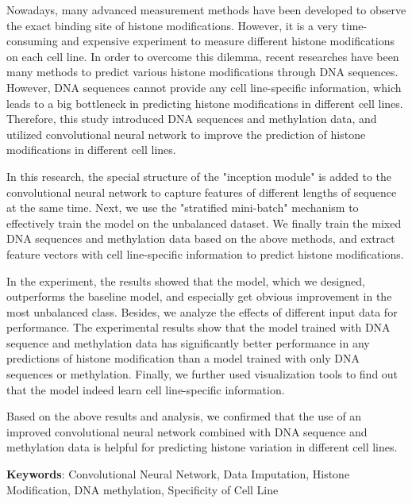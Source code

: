 Nowadays, many advanced measurement methods have been developed to observe the exact binding site of histone modifications. However, it is a very time-consuming and expensive experiment to measure different histone modifications on each cell line. In order to overcome this dilemma, recent researches have been many methods to predict various histone modifications through DNA sequences. However, DNA sequences cannot provide any cell line-specific information, which leads to a big bottleneck in predicting histone modifications in different cell lines. Therefore, this study introduced DNA sequences and methylation data, and utilized convolutional neural network to improve the prediction of histone modifications in different cell lines.

In this research, the special structure of the "inception module" is added to the convolutional neural network to capture features of different lengths of sequence at the same time. Next, we use the "stratified mini-batch" mechanism to effectively train the model on the unbalanced dataset. We finally train the mixed DNA sequences and methylation data based on the above methods, and extract feature vectors with cell line-specific information to predict histone modifications.

In the experiment, the results showed that the model, which we designed, outperforms the baseline model, and especially get obvious improvement in the most unbalanced class. Besides, we analyze the effects of different input data for performance. The experimental results show that the model trained with DNA sequence and methylation data has significantly better performance in any predictions of histone modification than a model trained with only DNA sequences or methylation. Finally, we further used visualization tools to find out that the model indeed learn cell line-specific information.

Based on the above results and analysis, we confirmed that the use of an improved convolutional neural network combined with DNA sequence and methylation data is helpful for predicting histone variation in different cell lines.

\begin{flushleft}
{{\bf Keywords}: Convolutional Neural Network, Data Imputation, Histone Modification, DNA methylation, Specificity of Cell Line}
\end{flushleft}
